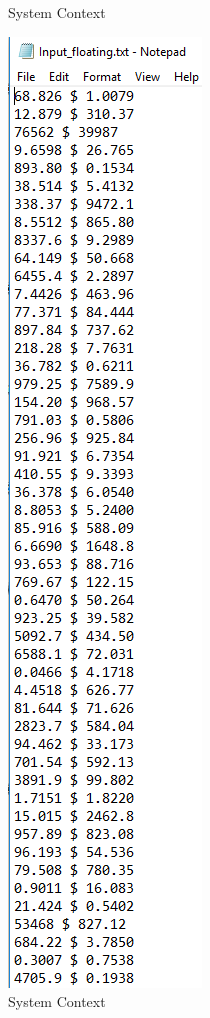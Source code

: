 \documentclass[12pt, titlepage]{article}
\begin{document}
\begin{enumerate}
\begin{figure}[h!]
\begin{minipage}[b]{0.4\textwidth}
\caption{System Context}
\label{Fig_Inputcomplex} 
\end{minipage}
\hfill
\begin{minipage}[b]{0.31\textwidth}
 \includegraphics[width=\textwidth]{Input_floating}
\caption{System Context}
\label{Fig_Inputfloating} 
\end{minipage}
\end{figure}
			

\end{enumerate}
\end{document}

